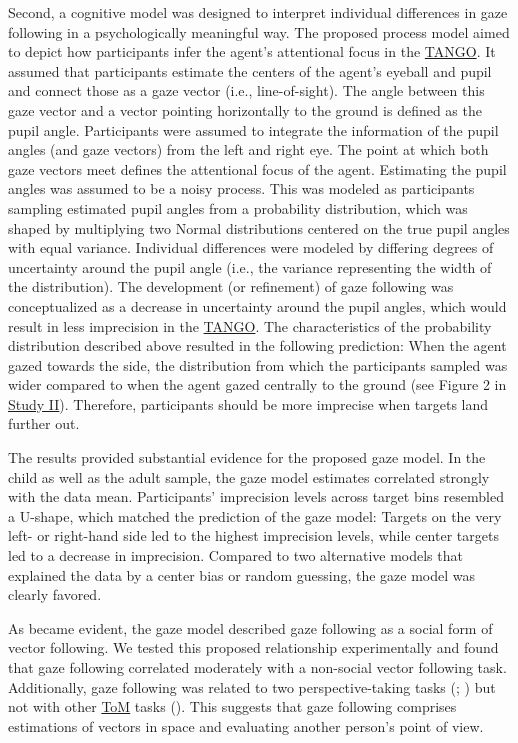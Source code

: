 \documentclass[
]{scrbook}
\begin{document}
Second, a cognitive model was designed to interpret individual differences in gaze following in a psychologically meaningful way. The proposed process model aimed to depict how participants infer the agent's attentional focus in the \hyperref[acronyms_TANGO]{TANGO}. It assumed that participants estimate the centers of the agent's eyeball and pupil and connect those as a gaze vector (i.e., line-of-sight). The angle between this gaze vector and a vector pointing horizontally to the ground is defined as the pupil angle. Participants were assumed to integrate the information of the pupil angles (and gaze vectors) from the left and right eye. The point at which both gaze vectors meet defines the attentional focus of the agent. Estimating the pupil angles was assumed to be a noisy process. This was modeled as participants sampling estimated pupil angles from a probability distribution, which was shaped by multiplying two Normal distributions centered on the true pupil angles with equal variance. Individual differences were modeled by differing degrees of uncertainty around the pupil angle (i.e., the variance representing the width of the distribution). The development (or refinement) of gaze following was conceptualized as a decrease in uncertainty around the pupil angles, which would result in less imprecision in the \hyperref[acronyms_TANGO]{TANGO}. The characteristics of the probability distribution described above resulted in the following prediction: When the agent gazed towards the side, the distribution from which the participants sampled was wider compared to when the agent gazed centrally to the ground (see Figure 2 in \hyperref[studyII]{Study II}). Therefore, participants should be more imprecise when targets land further out.

The results provided substantial evidence for the proposed gaze model. In the child as well as the adult sample, the gaze model estimates correlated strongly with the data mean. Participants' imprecision levels across target bins resembled a U-shape, which matched the prediction of the gaze model: Targets on the very left- or right-hand side led to the highest imprecision levels, while center targets led to a decrease in imprecision. Compared to two alternative models that explained the data by a center bias or random guessing, the gaze model was clearly favored.

As became evident, the gaze model described gaze following as a social form of vector following. We tested this proposed relationship experimentally and found that gaze following correlated moderately with a non-social vector following task. Additionally, gaze following was related to two perspective-taking tasks (; ) but not with other \hyperref[acronyms_ToM]{ToM} tasks (). This suggests that gaze following comprises estimations of vectors in space and evaluating another person's point of view.
\end{document}
